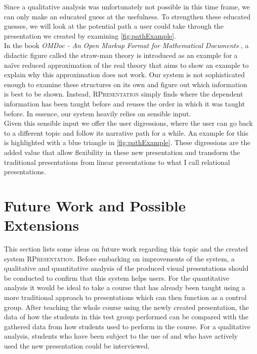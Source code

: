 \documentclass[twoside, 12pt]{article}
\newcommand{\sys}{\textsc{RPresentation}\xspace}
\begin{document}
Since a qualitative analysis was unfortunately not possible in this time frame, we can only make an educated guess at the usefulness. To strengthen these educated guesses, we will look at the potential path a user could take through the presentation we created by examining \autoref{fig:pathExample}.\\

In the book \textit{OMDoc - An Open Markup Format for Mathematical Documents} \cite{URL:omdocspec}, a didactic figure called the straw-man theory is introduced as an example for a naïve reduced approximation of the real theory that aims to show an example to explain why this approximation does not work. Our system is not sophisticated enough to examine these structures on its own and figure out which information is best to be shown. Instead, \sys simply finds where the dependent information has been taught before and reuses the order in which it was taught before. In essence, our system heavily relies on sensible input.\\

Given this sensible input we offer the user digressions, where the user can go back to a different topic and follow its narrative path for a while. An example for this is highlighted with a blue triangle in \autoref{fig:pathExample}. These digressions are the added value that allow flexibility in these new presentation and transform the traditional presentations from linear presentations to what I call relational presentations.\\


\section{Future Work and Possible Extensions}


This section lists some ideas on future work regarding this topic and the created system \sys. Before embarking on improvements of the system, a qualitative and quantitative analysis of the produced visual presentations should be conducted to confirm that this system helps users. For the quantitative analysis it would be ideal to take a course that has already been taught using a more traditional approach to presentations which can then function as a control group. After teaching the whole course using the newly created presentation, the data of how the students in this test group performed can be compared with the gathered data from how students used to perform in the course. For a qualitative analysis, students who have been subject to the use of and who have actively used the new presentation could be interviewed.\\
\end{document}
